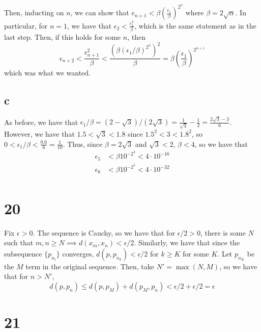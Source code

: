 \documentclass[12pt,letterpaper]{article}
\theoremstyle{definition}
\begin{document}
Then, inducting on $n$, we can show that $e_{n+1} < \beta\left(\frac{\epsilon_{1}}{\beta}\right)^{2^{n}}$ where $\beta = 2\sqrt{\alpha}$. In particular, for $n = 1$, we have that $\epsilon_{2} < \frac{\epsilon_{1}^{2}}{\beta}$, which is the same statement as in the last step. Then, if this holds for some $n$, then
\[
  \epsilon_{n+2} < \frac{\epsilon_{n+1}^{2}}{\beta} < \frac{(\beta \left(\epsilon_{1} / \beta\right)^{2^{n}})^{2}}{\beta} = \beta \left(\frac{\epsilon_{1}}{\beta}\right)^{2^{n+1}}
\]
which was what we wanted.

\subsection*{c}

As before, we have that $\epsilon_{1}/\beta = (2 - \sqrt{3})/(2\sqrt{3}) = \frac{1}{\sqrt{3}} - \frac{1}{2} = \frac{2\sqrt{3} - 3}{6}$. However, we have that $1.5 < \sqrt{3} < 1.8$ since $1.5^{2} < 3 < 1.8^{2}$, so $0 < \epsilon_{1}/\beta < \frac{0.6}{6} = \frac{1}{10}$. Thus, since $\beta = 2\sqrt{3}$ and $\sqrt{3} < 2$, $\beta < 4$, so we have that
\begin{align*}
  \epsilon_{5} &< \beta 10^{-2^{4}} < 4 \cdot 10^{-16} \\
  \epsilon_{6} &< \beta 10^{-2^{5}} < 4 \cdot 10^{-32} \\
\end{align*}

\section*{20}

Fix $\epsilon > 0$. The sequence is Cauchy, so we have that for $\epsilon/2 > 0$, there is some $N$ such that $m,n \geq N \implies d(x_{m}, x_{n}) < \epsilon/2$. Similarly, we have that since the subsequence $\{p_{n_{i}}\}$ converges, $d(p, p_{n_{k}}) < \epsilon / 2$ for $k \geq K$ for some $K$. Let $p_{n_{K}}$ be the $M$ term in the original sequence. Then, take $N' = \max(N, M)$, so we have that for $n > N'$,
\[
  d(p, p_{n}) \leq d(p, p_{M}) + d(p_{M}, p_{n}) < \epsilon/2 + \epsilon/2 = \epsilon
\]

\section*{21}
\end{document}
